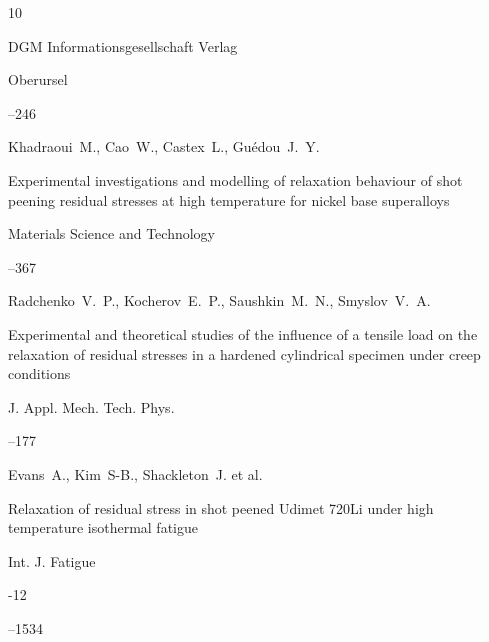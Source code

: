 \begin{thebibliography}{10}

\publ DGM Informationsgesellschaft Verlag

\publaddr Oberursel

--246







\by Khadraoui~M., Cao~W., Castex~L.,  Gu\'edou~J.~Y.

\paper Experimental investigations and modelling of relaxation behaviour of shot peening residual stresses at high temperature for nickel base superalloys

\jour Materials Science and Technology




--367






\by Radchenko~V.~P., Kocherov~E.~P., Saushkin~M.~N., Smyslov~V.~A.

\paper Experimental and theoretical studies of the influence of a tensile load on the relaxation of residual stresses in a hardened cylindrical specimen under creep conditions

\jour J. Appl. Mech. Tech. Phys.




--177






\by Evans~A., Kim~S-B., Shackleton~J. et al.

\paper Relaxation of residual stress in shot peened Udimet 720Li under high temperature isothermal fatigue

\jour Int. J. Fatigue



-12

--1534


\end{thebibliography}

